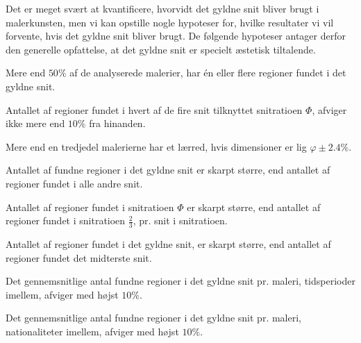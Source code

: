 {
{\sffamily Det er meget svært at kvantificere, hvorvidt det gyldne snit
bliver brugt i malerkunsten, men vi kan opstille nogle hypoteser for,
hvilke resultater vi vil forvente, hvis det gyldne snit bliver brugt.
De følgende hypoteser antager derfor den generelle opfattelse, at det
gyldne snit er specielt æstetisk tiltalende.
}

\begin{hypotese}
    Mere end $50\%$ af de analyserede malerier, har én eller flere
    regioner fundet i det gyldne snit.
    \label{hypo_binaer}
\end{hypotese}

\begin{hypotese}
    Antallet af regioner fundet i hvert af de fire snit tilknyttet snitratioen
    $\varPhi$, afviger ikke mere end $10\%$ fra hinanden.
    \label{hypo_fire_g_snit}
\end{hypotese}

\begin{hypotese}
    Mere end en tredjedel malerierne har et lærred, hvis
    dimensioner er lig $\varphi\pm2.4\%$.
    \label{hypo_golden_ractangle}
\end{hypotese}

\begin{hypotese}
    Antallet af fundne regioner i det gyldne snit er skarpt større, end
    antallet af regioner fundet i alle andre snit.
    \label{hypo_alle_andre_snit}
\end{hypotese}

\begin{hypotese}
    Antallet af regioner fundet i snitratioen $\varPhi$ er skarpt
    større, end antallet af regioner fundet i snitratioen $\frac{2}{3}$,
    pr. snit i snitratioen.
    \label{hypo_to_tredjedele}
\end{hypotese}

\begin{hypotese}
    Antallet af regioner fundet i det gyldne snit, er skarpt større, end
    antallet af regioner fundet det midterste snit.
    \label{hypo_midten}
\end{hypotese}

\begin{hypotese}
    Det gennemsnitlige antal fundne regioner i det gyldne snit pr.
    maleri, tidsperioder imellem, afviger med højst $10\%$.
    \label{hypo_tid}
\end{hypotese}

\begin{hypotese}
    Det gennemsnitlige antal fundne regioner i det gyldne snit pr.
    maleri, nationaliteter imellem, afviger med højst $10\%$.
    \label{hypo_nation}
\end{hypotese}

}
